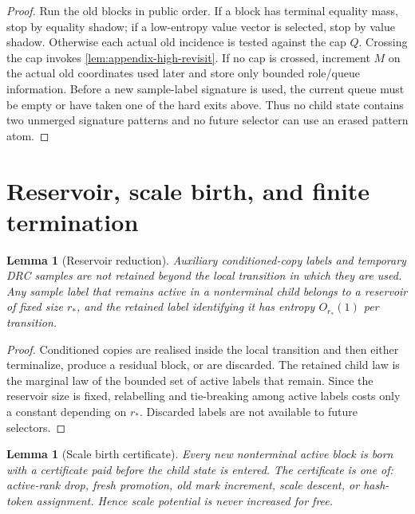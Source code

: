 \documentclass[11pt]{article}
\newcommand{\Cref}[1]{\ref{#1}}
\newtheorem{lemma}[theorem]{Lemma}
\theoremstyle{remark}
\begin{document}
\begin{proof}
Run the old blocks in public order.  If a block has terminal equality mass, stop by equality shadow; if a low-entropy value vector is selected, stop by value shadow.  Otherwise each actual old incidence is tested against the cap $Q$.  Crossing the cap invokes \Cref{lem:appendix-high-revisit}.  If no cap is crossed, increment $M$ on the actual old coordinates used later and store only bounded role/queue information.  Before a new sample-label signature is used, the current queue must be empty or have taken one of the hard exits above.  Thus no child state contains two unmerged signature patterns and no future selector can use an erased pattern atom.
\end{proof}

\section{Reservoir, scale birth, and finite termination}\label{app:termination}

\begin{lemma}[Reservoir reduction]\label{lem:appendix-reservoir}
Auxiliary conditioned-copy labels and temporary DRC samples are not retained beyond the local transition in which they are used.  Any sample label that remains active in a nonterminal child belongs to a reservoir of fixed size $r_*$, and the retained label identifying it has entropy $O_{r_*}(1)$ per transition.
\end{lemma}

\begin{proof}
Conditioned copies are realised inside the local transition and then either terminalize, produce a residual block, or are discarded.  The retained child law is the marginal law of the bounded set of active labels that remain.  Since the reservoir size is fixed, relabelling and tie-breaking among active labels costs only a constant depending on $r_*$.  Discarded labels are not available to future selectors.
\end{proof}

\begin{lemma}[Scale birth certificate]\label{lem:appendix-scale-birth}
Every new nonterminal active block is born with a certificate paid before the child state is entered.  The certificate is one of: active-rank drop, fresh promotion, old mark increment, scale descent, or hash-token assignment.  Hence scale potential is never increased for free.
\end{lemma}
\end{document}
